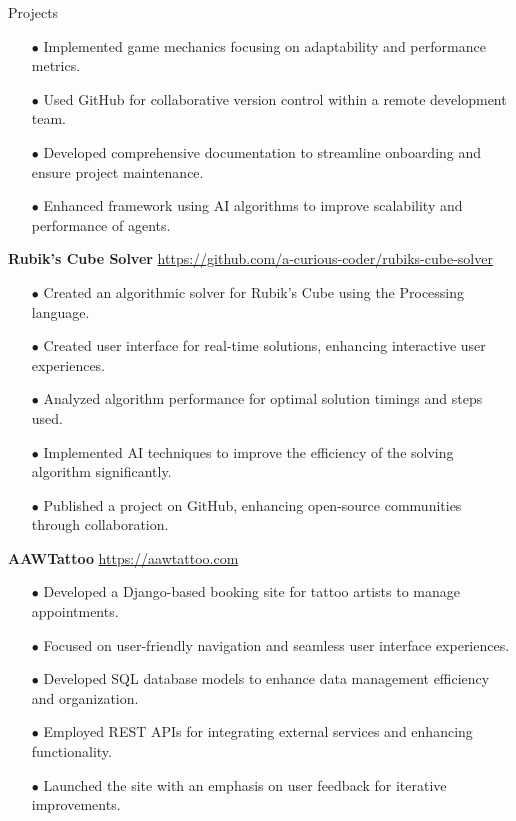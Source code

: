 \begin{rSection}{Projects}
\begin{itemize}[label=\myfancylabel, leftmargin=0.5cm, topsep=-5pt, itemsep=-1ex]
    \item[$\bullet$] Implemented game mechanics focusing on adaptability and performance metrics.
    \item[$\bullet$] Used GitHub for collaborative version control within a remote development team.
    \item[$\bullet$] Developed comprehensive documentation to streamline onboarding and ensure project maintenance.
    \item[$\bullet$] Enhanced framework using AI algorithms to improve scalability and performance of agents.
\end{itemize}
\vspace{0.12cm}
{\bf Rubik's Cube Solver}
\hspace{2 cm}{Processing, AI, GitHub}
\hfill{\href{https://github.com/a-curious-coder/rubiks-cube-solver}{https://github.com/a-curious-coder/rubiks-cube-solver}}
\begin{itemize}[label=\myfancylabel, leftmargin=0.5cm, topsep=-5pt, itemsep=-1ex]
\setlength\itemsep{-0.25cm}
    \item[$\bullet$] Created an algorithmic solver for Rubik's Cube using the Processing language.
    \item[$\bullet$] Created user interface for real-time solutions, enhancing interactive user experiences.
    \item[$\bullet$] Analyzed algorithm performance for optimal solution timings and steps used.
    \item[$\bullet$] Implemented AI techniques to improve the efficiency of the solving algorithm significantly.
    \item[$\bullet$] Published a project on GitHub, enhancing open-source communities through collaboration.
\end{itemize}
\vspace{0.12cm}
{\bf AAWTattoo}
\hspace{2 cm}{Django, Python}
\hfill{\href{https://aawtattoo.com}{https://aawtattoo.com}}
\begin{itemize}[label=\myfancylabel, leftmargin=0.5cm, topsep=-5pt, itemsep=-1ex]
\setlength\itemsep{-0.25cm}
    \item[$\bullet$] Developed a Django-based booking site for tattoo artists to manage appointments.
    \item[$\bullet$] Focused on user-friendly navigation and seamless user interface experiences.
    \item[$\bullet$] Developed SQL database models to enhance data management efficiency and organization.
    \item[$\bullet$] Employed REST APIs for integrating external services and enhancing functionality.
    \item[$\bullet$] Launched the site with an emphasis on user feedback for iterative improvements.
\end{itemize}
\end{rSection}